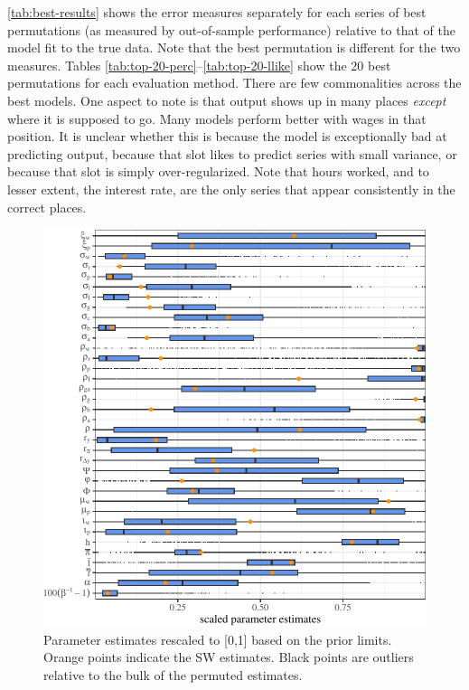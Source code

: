 \documentclass[11pt]{article}
\begin{document}
\autoref{tab:best-results} shows the error measures separately for each
series of best permutations (as measured by out-of-sample performance)
relative to that of the model fit to the true data. Note that the best
permutation is different for the two measures. Tables
\ref{tab:top-20-perc}--\ref{tab:top-20-llike} show the 20 best
permutations for each evaluation method. There are few commonalities
across the best models. One aspect to note is that output shows up in
many places \emph{except} where it is supposed to go. Many models
perform better with wages in that position. It is unclear whether this
is because the model is exceptionally bad at predicting output, because
that slot likes to predict series with small variance, or because that
slot is simply over-regularized. Note that hours worked, and to lesser
extent, the interest rate, are the only series that appear consistently
in the correct places.

\begin{figure}[t]

{\centering \includegraphics{gfx/scaled-parameter-boxplots-1} 

}

\caption{Parameter estimates rescaled to [0,1] based on the prior limits. Orange points indicate the SW estimates. Black points are outliers relative to the bulk of the permuted estimates.}\label{fig:scaled-parameter-boxplots}
\end{figure}
\end{document}
